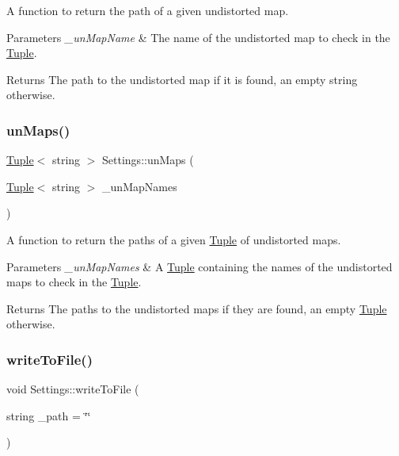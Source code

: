 A function to return the path of a given undistorted map. 


\begin{DoxyParams}{Parameters}
{\em \+\_\+un\+Map\+Name} & The name of the undistorted map to check in the \mbox{\hyperlink{class_tuple}{Tuple}}. \\
\hline
\end{DoxyParams}
\begin{DoxyReturn}{Returns}
The path to the undistorted map if it is found, an empty string otherwise. 
\end{DoxyReturn}
\mbox{\label{class_settings_aa89550d142cb4101faf35af214f4edff}} 
\subsubsection{\texorpdfstring{unMaps()}{unMaps()}\hspace{0.1cm}{\footnotesize\ttfamily [4/4]}}
{\footnotesize\ttfamily \mbox{\hyperlink{class_tuple}{Tuple}}$<$ string $>$ Settings\+::un\+Maps (\begin{DoxyParamCaption}\item[{\mbox{\hyperlink{class_tuple}{Tuple}}$<$ string $>$}]{\+\_\+un\+Map\+Names }\end{DoxyParamCaption})}



A function to return the paths of a given \mbox{\hyperlink{class_tuple}{Tuple}} of undistorted maps. 


\begin{DoxyParams}{Parameters}
{\em \+\_\+un\+Map\+Names} & A \mbox{\hyperlink{class_tuple}{Tuple}} containing the names of the undistorted maps to check in the \mbox{\hyperlink{class_tuple}{Tuple}}. \\
\hline
\end{DoxyParams}
\begin{DoxyReturn}{Returns}
The paths to the undistorted maps if they are found, an empty \mbox{\hyperlink{class_tuple}{Tuple}} otherwise. 
\end{DoxyReturn}
\mbox{\label{class_settings_a69b5dc81f8928efdcfc19e409f6015fb}} 
\subsubsection{\texorpdfstring{writeToFile()}{writeToFile()}}
{\footnotesize\ttfamily void Settings\+::write\+To\+File (\begin{DoxyParamCaption}\item[{string}]{\+\_\+path = {\ttfamily \char`\"{}\char`\"{}} }\end{DoxyParamCaption})}



